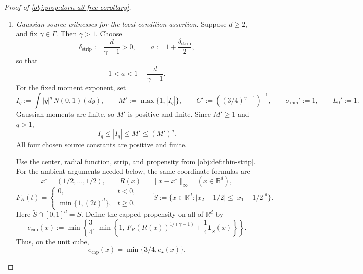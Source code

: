 \begin{proof}[Proof of \cref{obj:prop:dorn-a3-free-corollary}]
\begin{enumerate}
Every admissible radius bounds the function itself. Taking the infimum of those bounds gives
\[
|g(x)|\le \|g\|_{\mathcal H^\beta},
\qquad x\in[0,1]^d.
\]
Constant functions satisfy the source seminorm restriction because their derivative differences vanish. Applying the preceding inequality to the constant functions \(1\) and \(M\), which admit radii by the completion result, yields
\[
1\le \|1\|_{\mathcal H^\beta},
\qquad
M\le \|M\|_{\mathcal H^\beta}.
\]
The constant function \(1\), with amplitude and seminorm bounds both equal to \(1\), is admissible in the definition of \(C_{d,\beta}\). The constant function \(M\) is admissible in the definition of \(L_*\). Hence
\[
0<\frac12\le C_{d,\beta}\le K_{d,\beta}<\infty,
\qquad
0<M\le L_*.
\]
Finally, every function contributing to \(L_*\) also contributes, after normalization, to \(C_{d,\beta}\):
\[
\frac{\|u\circ T\|_{\mathcal H^\beta}}{M+L_0}
\le C_{d,\beta}.
\]
Taking the supremum over these functions proves
\[
0<L_*\le C_{d,\beta}(M+L_0)<\infty.
\]

\item \emph{Gaussian source witnesses for the local-condition assertion.}
Suppose \(d\ge2\), and fix \(\gamma\in\Gamma\). Then \(\gamma>1\). Choose
\[
\delta_{\mathrm{strip}}:=\frac{d}{\gamma-1}>0,
\qquad
a:=1+\frac{\delta_{\mathrm{strip}}}{2},
\]
so that
\[
1<a<1+\frac{d}{\gamma-1}.
\]
For the fixed moment exponent, set
\[
I_q:=\int |y|^q\,N(0,1)(dy),
\qquad
M':=\max\{1,|I_q|\},
\qquad
C':=\left((3/4)^{\gamma-1}\right)^{-1},
\qquad
\sigma_{\min}':=1,
\qquad
L_0':=1.
\]
Gaussian moments are finite, so \(M'\) is positive and finite. Since \(M'\ge1\) and \(q>1\),
\[
I_q\le |I_q|\le M'\le (M')^q.
\]
All four chosen source constants are positive and finite.

Use the center, radial function, strip, and propensity from
\cref{obj:def:thin-strip}. For the ambient arguments needed below, the same coordinate formulas are
\[
x^\circ=(1/2,\ldots,1/2),
\qquad
R(x)=\|x-x^\circ\|_\infty
\quad(x\in\mathbb R^d),
\]
\[
F_R(t)=
\begin{cases}
0,&t<0,\\
\min\{1,(2t)^d\},&t\ge0,
\end{cases}
\qquad
\widetilde S:=
\{x\in\mathbb R^d:
|x_2-1/2|\le |x_1-1/2|^a\}.
\]
Here \(\widetilde S\cap[0,1]^d=S\). Define the capped propensity on all of \(\mathbb R^d\) by
\[
e_{\mathrm{cap}}(x)
:=
\min\left\{\frac34,\,
\min\left\{1,\,
F_R(R(x))^{1/(\gamma-1)}
+\frac14\mathbf1_{\widetilde S}(x)\right\}\right\}.
\]
Thus, on the unit cube,
\[
e_{\mathrm{cap}}(x)=\min\{3/4,e_\star(x)\}.
\]


\end{enumerate}
\end{proof}
